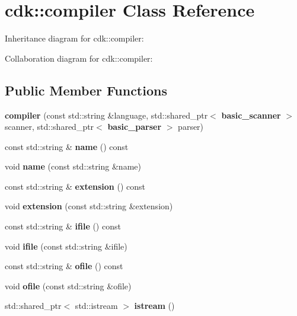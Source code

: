 \section{cdk\+:\+:compiler Class Reference}
\label{classcdk_1_1compiler}


Inheritance diagram for cdk\+:\+:compiler\+:


Collaboration diagram for cdk\+:\+:compiler\+:
\subsection*{Public Member Functions}
\begin{DoxyCompactItemize}
\item 
\mbox{\label{classcdk_1_1compiler_a0718890212e30c490d31158ea8d75f73}} 
{\bfseries compiler} (const std\+::string \&language, std\+::shared\+\_\+ptr$<$ \textbf{ basic\+\_\+scanner} $>$ scanner, std\+::shared\+\_\+ptr$<$ \textbf{ basic\+\_\+parser} $>$ parser)
\item 
\mbox{\label{classcdk_1_1compiler_a60a0cacc896d803ab6d846f10befe3a5}} 
const std\+::string \& {\bfseries name} () const
\item 
\mbox{\label{classcdk_1_1compiler_a933cbe2e866df6bcf976f3b2bca53873}} 
void {\bfseries name} (const std\+::string \&name)
\item 
\mbox{\label{classcdk_1_1compiler_a555e4bbb1dbac31eaff757d66615e97c}} 
const std\+::string \& {\bfseries extension} () const
\item 
\mbox{\label{classcdk_1_1compiler_a944e52a202d89b3ba19988eacdc617b2}} 
void {\bfseries extension} (const std\+::string \&extension)
\item 
\mbox{\label{classcdk_1_1compiler_a16f6a81921fc6aab73e7fefa44b3683e}} 
const std\+::string \& {\bfseries ifile} () const
\item 
\mbox{\label{classcdk_1_1compiler_ac7a952f66fed4125e3054b5c7592ddb1}} 
void {\bfseries ifile} (const std\+::string \&ifile)
\item 
\mbox{\label{classcdk_1_1compiler_a248dc1890a92c5f68aaba29dc1ffca14}} 
const std\+::string \& {\bfseries ofile} () const
\item 
\mbox{\label{classcdk_1_1compiler_a2077beaf9b1bc9d087830d609a397de5}} 
void {\bfseries ofile} (const std\+::string \&ofile)
\item 
\mbox{\label{classcdk_1_1compiler_ae7cf9a49176b0ab9239f0c4d2e5b1668}} 
std\+::shared\+\_\+ptr$<$ std\+::istream $>$ {\bfseries istream} ()
\item 

\end{DoxyCompactItemize}
